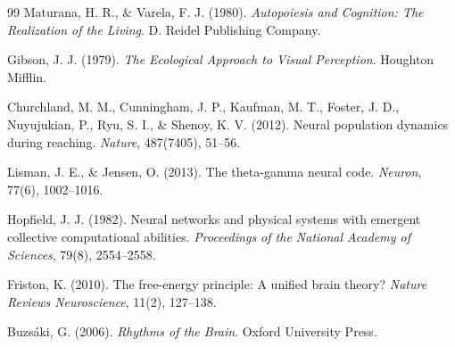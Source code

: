 \documentclass{article}
\begin{document}
\begin{thebibliography}{99}
Maturana, H. R., \& Varela, F. J. (1980).
\textit{Autopoiesis and Cognition: The Realization of the Living}.
D. Reidel Publishing Company.

Gibson, J. J. (1979).
\textit{The Ecological Approach to Visual Perception}.
Houghton Mifflin.

Churchland, M. M., Cunningham, J. P., Kaufman, M. T., Foster, J. D., Nuyujukian, P., Ryu, S. I., \& Shenoy, K. V. (2012).
Neural population dynamics during reaching.
\textit{Nature}, 487(7405), 51--56.

Lisman, J. E., \& Jensen, O. (2013).
The theta-gamma neural code.
\textit{Neuron}, 77(6), 1002--1016.

Hopfield, J. J. (1982).
Neural networks and physical systems with emergent collective computational abilities.
\textit{Proceedings of the National Academy of Sciences}, 79(8), 2554--2558.

Friston, K. (2010).
The free-energy principle: A unified brain theory?
\textit{Nature Reviews Neuroscience}, 11(2), 127--138.

Buzs{\'a}ki, G. (2006).
\textit{Rhythms of the Brain}.
Oxford University Press.

\end{thebibliography}
\end{document}
